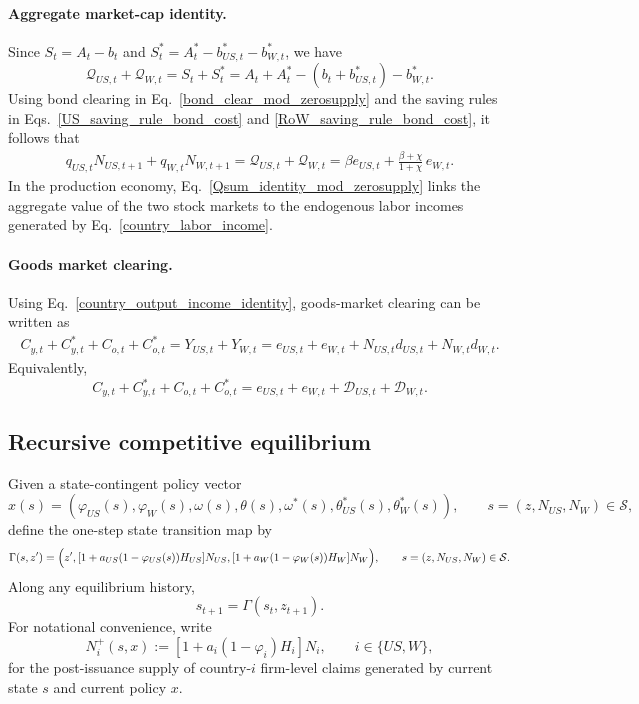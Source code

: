 \documentclass{article}
\begin{document}
\paragraph{Aggregate market-cap identity.}
Since $S_t=A_t-b_t$ and $S_t^*=A_t^*-b_{US,t}^*-b_{W,t}^*$, we have
\[
\mathcal Q_{US,t}+\mathcal Q_{W,t}=S_t+S_t^*
=
A_t+A_t^*-(b_t+b_{US,t}^*)-b_{W,t}^*.
\]
Using bond clearing in Eq.~\eqref{bond_clear_mod_zerosupply} and the saving rules in Eqs.~\eqref{US_saving_rule_bond_cost} and \eqref{RoW_saving_rule_bond_cost}, it follows that
\begin{align}\label{Qsum_identity_mod_zerosupply}
\boxed{
q_{US,t}N_{US,t+1}+q_{W,t}N_{W,t+1}
=
\mathcal Q_{US,t}+\mathcal Q_{W,t}
=
\beta e_{US,t}
+\frac{\beta+\chi}{1+\chi}\,e_{W,t}.
}
\end{align}
In the production economy, Eq.~\eqref{Qsum_identity_mod_zerosupply} links the aggregate value of the two stock markets to the endogenous labor incomes generated by Eq.~\eqref{country_labor_income}.

\paragraph{Goods market clearing.}
Using Eq.~\eqref{country_output_income_identity}, goods-market clearing can be written as
\begin{align}\label{goods_clear_mod}
C_{y,t}+C^*_{y,t}+C_{o,t}+C^*_{o,t}
=
Y_{US,t}+Y_{W,t}
=
e_{US,t}+e_{W,t}
+N_{US,t}d_{US,t}
+N_{W,t}d_{W,t}.
\end{align}
Equivalently,
\[
C_{y,t}+C^*_{y,t}+C_{o,t}+C^*_{o,t}
=
e_{US,t}+e_{W,t}+\mathcal D_{US,t}+\mathcal D_{W,t}.
\]

\subsection{Recursive competitive equilibrium}

Given a state-contingent policy vector
\[
x(s)=(\varphi_{US}(s),\varphi_W(s),\omega(s),\theta(s),\omega^*(s),\theta_{US}^*(s),\theta_W^*(s)),
\qquad
s=(z,N_{US},N_W)\in\mathcal S,
\]
define the one-step state transition map by
\begin{equation}\label{recursive_next_state}
\Gamma(s,z')
=
\Bigl(
 z',
 [1+a_{US}(1-\varphi_{US}(s))H_{US}]N_{US},
 [1+a_W(1-\varphi_W(s))H_W]N_W
\Bigr),
\qquad
s=(z,N_{US},N_W)\in\mathcal S.
\end{equation}
Along any equilibrium history,
\[
s_{t+1}=\Gamma(s_t,z_{t+1}).
\]
For notational convenience, write
\[
N_i^+(s,x)
:=
[1+a_i(1-\varphi_i)H_i]N_i,
\qquad
i\in\{US,W\},
\]
for the post-issuance supply of country-$i$ firm-level claims generated by current state $s$ and current policy $x$.
\end{document}
